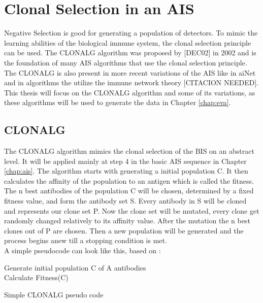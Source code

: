 \section{Clonal Selection in an AIS}
Negative Selection is good for generating a population of detectors. To mimic the learning abilities of the biological immune system, the clonal selection principle can be used. The CLONALG algorithm was proposed by [DEC02] in 2002 and is the foundation of many AIS algorithms that use the clonal selection principle. The CLONALG is also present in more recent variations of the AIS like in aiNet and in algorithms the utilize the immune network theory [CITACION NEEDED]. This thesis will focus on the CLONALG algorithm and some of its variations, as these algorithms will be used to generate the data in Chapter \ref{chap:eva}.
\subsection{CLONALG}
The CLONALG algorithm mimics the clonal selection of the BIS on an abstract level. It will be applied mainly at step 4 in the basic AIS sequence in Chapter \ref{chap:ais}. The algorithm starts with generating a initial population C. It then calculates the affinity of the population to an antigen which is called the fitness. The n best antibodies of the population C will be chosen, determined by a fixed fitness value, and form the antibody set S. Every antibody in S will be cloned and represents our clone set P. Now the clone set will be mutated, every clone get randomly changed relatively to its affinity value. After the mutation the n best clones out of P are chosen. Then a new population will be generated and the process begins anew till a stopping condition is met.\\
A simple pseudocode can look like this, based on \cite{RIFF09}:
\begin{algorithm}
	Generate initial population C of A antibodies\\
	Calculate Fitness(C)\\
	\caption{Simple CLONALG pseudo code}
\end{algorithm}\\
